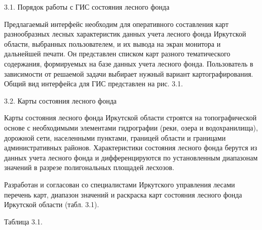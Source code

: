 \documentclass{report}
\begin{document}
3.1. Порядок работы с ГИС состояния лесного фонда

Предлагаемый интерфейс необходим для оперативного составления карт разнообразных лесных характеристик данных учета
лесного фонда Иркутской области, выбранных пользователем, и их вывода на экран монитора и дальнейшей печати. Он
представлен списком карт разного тематического содержания, формируемых на базе данных учета лесного фонда. Пользователь
в зависимости от решаемой задачи выбирает нужный вариант картографирования. Общий вид интерфейса для ГИС представлен на
рис. 3.1.  

3.2. Карты состояния лесного фонда

Карты состояния лесного фонда Иркутской области строятся на топографической основе с необходимыми элементами гидрографии
(реки, озера и водохранилища), дорожной сети, населенными пунктами, границей области и границами административных
районов. Характеристики состояния лесного фонда берутся из данных учета лесного фонда и дифференцируются по
установленным диапазонам значений в разрезе полигональных площадей лесхозов. 

Разработан и согласован со специалистами Иркутского управления лесами перечень карт, диапазон значений и раскраска карт
состояния лесного фонда Иркутской области (табл. 3.1).  

Таблица 3.1. 
\end{document}
